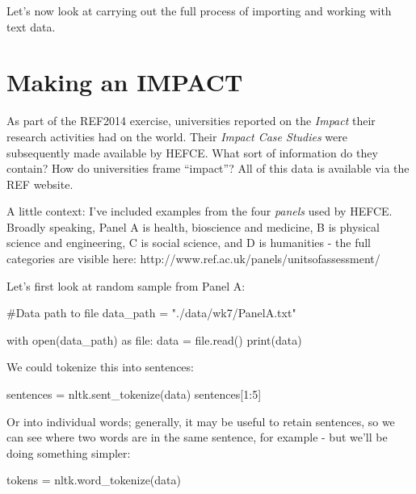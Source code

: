 \documentclass[
  letterpaper,
  DIV=11,
  numbers=noendperiod]{scrreprt}
\newenvironment{Shaded}{\begin{snugshade}}{\end{snugshade}}
\newcommand{\BuiltInTok}[1]{\textcolor[rgb]{0.00,0.23,0.31}{#1}}
\newcommand{\CommentTok}[1]{\textcolor[rgb]{0.37,0.37,0.37}{#1}}
\newcommand{\ControlFlowTok}[1]{\textcolor[rgb]{0.00,0.23,0.31}{#1}}
\newcommand{\DecValTok}[1]{\textcolor[rgb]{0.68,0.00,0.00}{#1}}
\newcommand{\ImportTok}[1]{\textcolor[rgb]{0.00,0.46,0.62}{#1}}
\newcommand{\NormalTok}[1]{\textcolor[rgb]{0.00,0.23,0.31}{#1}}
\newcommand{\OperatorTok}[1]{\textcolor[rgb]{0.37,0.37,0.37}{#1}}
\newcommand{\StringTok}[1]{\textcolor[rgb]{0.13,0.47,0.30}{#1}}
\begin{document}
Let's now look at carrying out the full process of importing and working
with text data.

\hypertarget{making-an-impact}{%
\section{Making an IMPACT}\label{making-an-impact}}

As part of the REF2014 exercise, universities reported on the
\emph{Impact} their research activities had on the world. Their
\emph{Impact Case Studies} were subsequently made available by HEFCE.
What sort of information do they contain? How do universities frame
``impact''? All of this data is available via the REF website.

A little context: I've included examples from the four \emph{panels}
used by HEFCE. Broadly speaking, Panel A is health, bioscience and
medicine, B is physical science and engineering, C is social science,
and D is humanities - the full categories are visible here:
http://www.ref.ac.uk/panels/unitsofassessment/

Let's first look at random sample from Panel A:

\begin{Shaded}
\begin{Highlighting}[]
\CommentTok{\#Data path to file}
\NormalTok{data\_path }\OperatorTok{=} \StringTok{"./data/wk7/PanelA.txt"}

\ControlFlowTok{with} \BuiltInTok{open}\NormalTok{(data\_path) }\ImportTok{as} \BuiltInTok{file}\NormalTok{:}
\NormalTok{    data }\OperatorTok{=} \BuiltInTok{file}\NormalTok{.read()}
\BuiltInTok{print}\NormalTok{(data)}
\end{Highlighting}
\end{Shaded}

We could tokenize this into sentences:

\begin{Shaded}
\begin{Highlighting}[]
\NormalTok{sentences }\OperatorTok{=}\NormalTok{ nltk.sent\_tokenize(data)}
\NormalTok{sentences[}\DecValTok{1}\NormalTok{:}\DecValTok{5}\NormalTok{]}
\end{Highlighting}
\end{Shaded}

Or into individual words; generally, it may be useful to retain
sentences, so we can see where two words are in the same sentence, for
example - but we'll be doing something simpler:

\begin{Shaded}
\begin{Highlighting}[]
\NormalTok{tokens }\OperatorTok{=}\NormalTok{ nltk.word\_tokenize(data)}
\end{Highlighting}
\end{Shaded}
\end{document}
